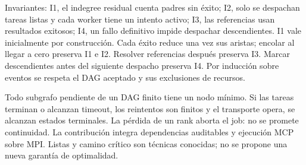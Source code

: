 Invariantes: I1, el indegree residual cuenta padres sin éxito; I2,
solo se despachan tareas listas y cada worker tiene un intento activo;
I3, las referencias usan resultados exitosos; I4, un fallo definitivo
impide despachar descendientes. I1 vale inicialmente por construcción.
Cada éxito reduce una vez sus aristas; encolar al llegar a cero preserva
I1 e I2. Resolver referencias después preserva I3. Marcar descendientes
antes del siguiente despacho preserva I4. Por inducción sobre eventos
se respeta el DAG aceptado y sus exclusiones de recursos.

Todo subgrafo pendiente de un DAG finito tiene un nodo mínimo.
Si las tareas terminan o alcanzan timeout, los reintentos son finitos
y el transporte opera, se alcanzan estados terminales. La pérdida de
un rank aborta el job: no se promete continuidad.
La contribución integra dependencias auditables y ejecución MCP sobre
MPI. Listas y camino crítico son técnicas conocidas; no se propone
una nueva garantía de optimalidad.
